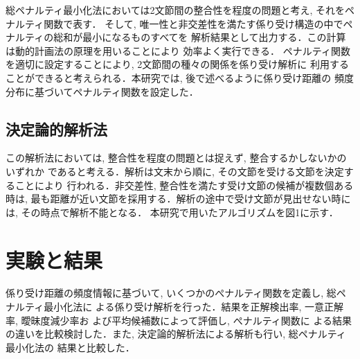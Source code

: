 総ペナルティ最小化法においては2文節間の整合性を程度の問題と考え, それをペナルティ関数で表す．
そして, 唯一性と非交差性を満たす係り受け構造の中でペナルティの総和が最小になるものすべてを
解析結果として出力する．この計算は動的計画法の原理を用いることにより
効率よく実行できる\cite{ozeki}．
ペナルティ関数を適切に設定することにより, 2文節間の種々の関係を係り受け解析に
利用することができると考えられる．本研究では, 後で述べるように係り受け距離の
頻度分布に基づいてペナルティ関数を設定した．
\subsection{決定論的解析法}
この解析法\cite{kurohashi}においては, 整合性を程度の問題とは捉えず, 整合するかしないかのいずれか
であると考える．解析は文末から順に, その文節を受ける文節を決定することにより
行われる．非交差性, 整合性を満たす受け文節の候補が複数個ある時は,
 最も距離が近い文節を採用する．解析の途中で受け文節が見出せない時には, その時点で解析不能となる．
本研究で用いたアルゴリズムを図1に示す．

\section{実験と結果}  
係り受け距離の頻度情報に基づいて, いくつかのぺナルティ関数を定義し, 総ペナルティ最小化法に
よる係り受け解析を行った．結果を正解検出率, 一意正解率, 曖昧度減少率お
よび平均候補数によって評価し, ぺナルティ関数に
よる結果の違いを比較検討した．また, 決定論的解析法による解析も行い, 総ペナルティ最小化法の
結果と比較した．

